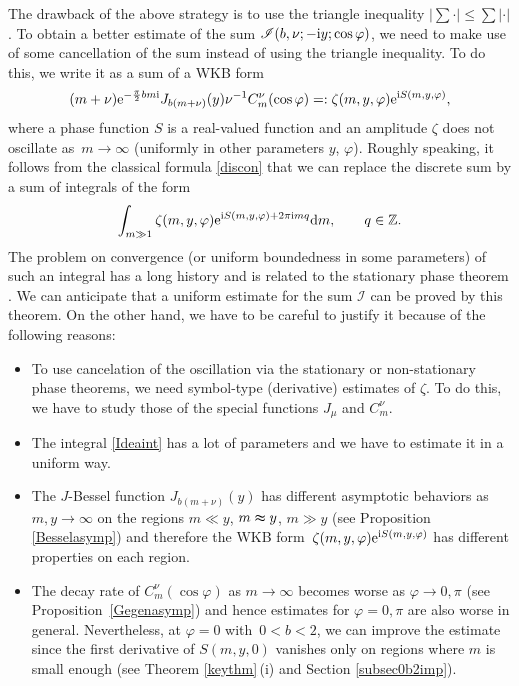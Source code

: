 \documentclass[10pt,a4paper]{amsart}
\numberwithin{equation}{section}
\def\f{\varphi}
\def\m{\mu}
\def\n{\nu}
\def\z{\zeta}
\newcommand{\sI}{\mathscr{I}}
\begin{document}
The drawback of the above strategy is to use the triangle inequality $|\sum \cdot|\leq \sum|\cdot|$.
To obtain a better estimate of the sum $\sI(b,\nu;-{\rm i}y;\cos\f)$, we need to make use of some cancellation of the sum instead of using the triangle inequality.
To do this, we write it as a sum of a WKB form
\begin{align*}
(m+\nu){\rm e}^{-\frac{\pi}{2}bm{\rm i}}J_{b(m+\n)}(y)\n^{-1}C^{\nu}_m(\cos\f)=:\z(m,y,\f){\rm e}^{{\rm i}S(m,y,\f)},
\end{align*}
where a phase function $S$ is a real-valued function and an amplitude $\z$ does not oscillate as~${m\to \infty}$ (uniformly in other parameters $y$, $\f$). Roughly speaking, it follows from the classical formula \eqref{discon} that we can replace the discrete sum by a sum of integrals of the form
\begin{align}\label{Ideaint}
\int_{m\gg 1}\z(m,y,\f){\rm e}^{{\rm i}S(m,y,\f)+2\pi {\rm i} mq} {\rm d}m,\qquad q\in\mathbb{Z}.
\end{align}
The problem on convergence (or uniform boundedness in some parameters) of such an integral has a long history and is related to the stationary phase theorem \cite{S}. We can anticipate that a uniform estimate for the sum $\sI$ can be proved by this theorem. On the other hand, we have to be careful to justify it because of the following reasons:
\begin{itemize}\itemsep=0pt
\item To use cancelation of the oscillation via the stationary or non-stationary phase theorems, we need symbol-type (derivative) estimates of $\z$. To do this, we have to study those of the special functions $J_{\m}$ and $C_{m}^{\n}$.

\item The integral \eqref{Ideaint} has a lot of parameters and we have to estimate it in a uniform way.

\item The $J$-Bessel function $J_{b(m+\n)}(y)$ has different asymptotic behaviors as $m,y\to \infty$ on the regions $m\ll y$, $m\thickapprox y$, $m\gg y$ (see Proposition \ref{Besselasymp}) and therefore the WKB form~${\z(m,y,\f){\rm e}^{{\rm i}S(m,y,\f)}}$ has different properties on each region.

\item The decay rate of $C^{\nu}_m(\cos\f)$ as $m\to \infty$ becomes worse as $\f\to 0,\pi$ (see Proposition~\ref{Gegenasymp}) and hence estimates for $\f=0,\pi$ are also worse in general. Nevertheless, at $\f=0$ with~${0<b<2}$, we can improve the estimate since the first derivative of $S(m,y,0)$ vanishes only on regions where $m$ is small enough (see Theorem \ref{keythm}\,(i) and Section \ref{subsec0b2imp}).
\end{itemize}
\end{document}
